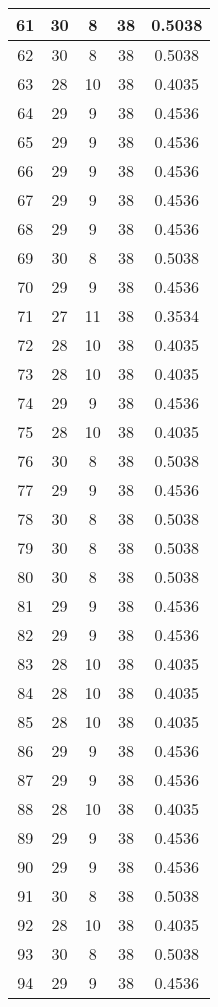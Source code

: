 \documentclass[letterpaper, 12pt]{article}
\begin{document}
\begin{longtable}{|c|c|c|c|c|}
\hline
61 & 30 & 8 & 38 & 0.5038 \\
\hline
62 & 30 & 8 & 38 & 0.5038 \\
\hline
63 & 28 & 10 & 38 & 0.4035 \\
\hline
64 & 29 & 9 & 38 & 0.4536 \\
\hline
65 & 29 & 9 & 38 & 0.4536 \\
\hline
66 & 29 & 9 & 38 & 0.4536 \\
\hline
67 & 29 & 9 & 38 & 0.4536 \\
\hline
68 & 29 & 9 & 38 & 0.4536 \\
\hline
69 & 30 & 8 & 38 & 0.5038 \\
\hline
70 & 29 & 9 & 38 & 0.4536 \\
\hline
71 & 27 & 11 & 38 & 0.3534 \\
\hline
72 & 28 & 10 & 38 & 0.4035 \\
\hline
73 & 28 & 10 & 38 & 0.4035 \\
\hline
74 & 29 & 9 & 38 & 0.4536 \\
\hline
75 & 28 & 10 & 38 & 0.4035 \\
\hline
76 & 30 & 8 & 38 & 0.5038 \\
\hline
77 & 29 & 9 & 38 & 0.4536 \\
\hline
78 & 30 & 8 & 38 & 0.5038 \\
\hline
79 & 30 & 8 & 38 & 0.5038 \\
\hline
80 & 30 & 8 & 38 & 0.5038 \\
\hline
81 & 29 & 9 & 38 & 0.4536 \\
\hline
82 & 29 & 9 & 38 & 0.4536 \\
\hline
83 & 28 & 10 & 38 & 0.4035 \\
\hline
84 & 28 & 10 & 38 & 0.4035 \\
\hline
85 & 28 & 10 & 38 & 0.4035 \\
\hline
86 & 29 & 9 & 38 & 0.4536 \\
\hline
87 & 29 & 9 & 38 & 0.4536 \\
\hline
88 & 28 & 10 & 38 & 0.4035 \\
\hline
89 & 29 & 9 & 38 & 0.4536 \\
\hline
90 & 29 & 9 & 38 & 0.4536 \\
\hline
91 & 30 & 8 & 38 & 0.5038 \\
\hline
92 & 28 & 10 & 38 & 0.4035 \\
\hline
93 & 30 & 8 & 38 & 0.5038 \\
\hline
94 & 29 & 9 & 38 & 0.4536 \\
\hline

\end{longtable}
\end{document}
